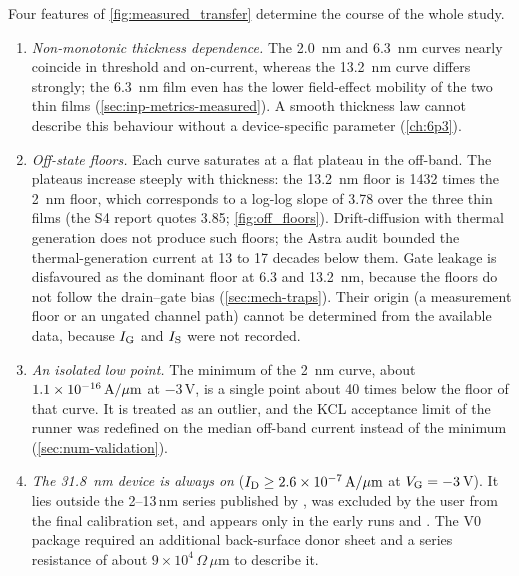 Four features of \cref{fig:measured_transfer} determine the course of the whole study.
\begin{enumerate}
  \item \emph{Non-monotonic thickness dependence.} The \SI{2.0}{nm} and \SI{6.3}{nm} curves nearly coincide in
        threshold and on-current, whereas the \SI{13.2}{nm} curve differs strongly; the \SI{6.3}{nm} film even has
        the lower field-effect mobility of the two thin films (\cref{sec:inp-metrics-measured}). A smooth thickness
        law cannot describe this behaviour without a device-specific parameter (\cref{ch:6p3}).
  \item \emph{Off-state floors.} Each curve saturates at a flat plateau in the off-band. The plateaus increase steeply
        with thickness: the \SI{13.2}{nm} floor is 1432 times the \SI{2}{nm} floor, which corresponds to a log-log
        slope of 3.78 over the three thin films (the S4 report quotes 3.85; \cref{fig:off_floors}). Drift-diffusion
        with thermal generation does not produce such floors; the Astra audit bounded the thermal-generation current
        at 13 to 17 decades below them. Gate leakage is disfavoured as the dominant floor at 6.3 and \SI{13.2}{nm},
        because the floors do not follow the drain--gate bias (\cref{sec:mech-traps}). Their origin (a measurement
        floor or an ungated channel path) cannot be determined from the available data, because $I_{\mathrm{G}}$ and $I_{\mathrm{S}}$ were
        not recorded.
  \item \emph{An isolated low point.} The minimum of the \SI{2}{nm} curve, about $1.1\times10^{-16}\,\mathrm{A}/\mu\mathrm{m}$ at
        $-3$\,V, is a single point about 40 times below the floor of that curve. It is treated as an outlier, and the
        KCL acceptance limit of the runner was redefined on the median off-band current instead of the minimum
        (\cref{sec:num-validation}).
  \item \emph{The \SI{31.8}{nm} device is always on} ($I_{\mathrm{D}} \ge 2.6\times10^{-7}\,\mathrm{A}/\mu\mathrm{m}$ at $V_{\mathrm{G}} = -3$\,V). It lies
        outside the \mbox{2--13\,nm} series published by \citet[p.~2]{Januar2026}, was excluded by the user from the
        final calibration set, and appears only in the early runs  and . The V0 package required
        an additional back-surface donor sheet and a series resistance of about $9\times10^{4}\,\Omega\,\mu$m to
        describe it.
\end{enumerate}

